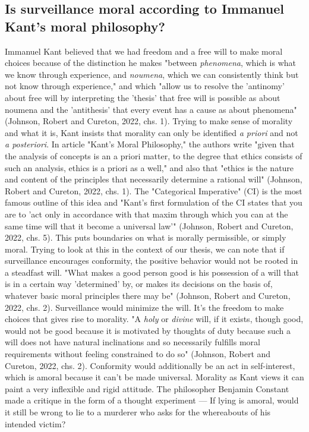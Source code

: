\documentclass[11pt]{article}
\begin{document}
\subsection{Is surveillance moral according to Immanuel Kant's moral philosophy?}
Immanuel Kant believed that we had freedom and a free will to make moral choices because of the distinction he makes "between \textit{phenomena}, which is what we know through experience, and \textit{noumena}, which we can consistently think but not know through experience," and which "allow us to resolve the 'antinomy' about free will by interpreting the 'thesis' that free will is possible as about noumena and the 'antithesis' that every event has a cause as about phenomena" (Johnson, Robert and Cureton, 2022, chs. 1). Trying to make sense of morality and what it is, Kant insists that morality can only be identified \textit{a priori} and not \textit{a posteriori}. In article "Kant’s Moral Philosophy," the authors write "given that the analysis of concepts is an a priori matter, to the degree that ethics consists of such an analysis, ethics is a priori as a well," and also that "ethics is the nature and content of the principles that necessarily determine a rational will" (Johnson, Robert and Cureton, 2022, chs. 1). The "Categorical Imperative" (CI) is the most famous outline of this idea and "Kant’s first formulation of the CI states that you are to 'act only in accordance with that maxim through which you can at the same time will that it become a universal law'" (Johnson, Robert and Cureton, 2022, chs. 5). This puts boundaries on what is morally permissible, or simply moral. Trying to look at this in the context of our thesis, we can note that if surveillance encourages conformity, the positive behavior would not be rooted in a steadfast will. "What makes a good person good is his possession of a will that is in a certain way 'determined' by, or makes its decisions on the basis of, whatever basic moral principles there may be" (Johnson, Robert and Cureton, 2022, chs. 2). Surveillance would minimize the will. It's the freedom to make choices that gives rise to morality. "A \textit{holy} or \textit{divine} will, if it exists, though good, would not be good because it is motivated by thoughts of duty because such a will does not have natural inclinations and so necessarily fulfills moral requirements without feeling constrained to do so" (Johnson, Robert and Cureton, 2022, chs. 2). Conformity would additionally be an act in self-interest, which is amoral because it can't be made universal. Morality as Kant views it can paint a very inflexible and rigid attitude. The philosopher Benjamin Constant made a critique in the form of a thought experiment --- If lying is amoral, would it still be wrong to lie to a murderer who asks for the whereabouts of his intended victim? \\ \\
\end{document}
